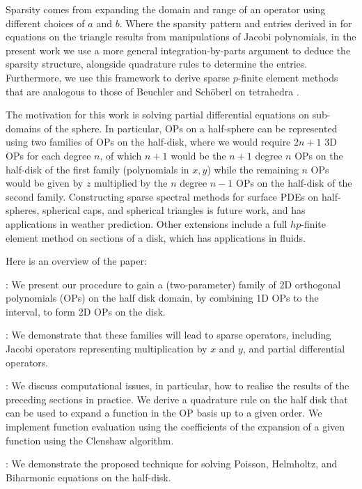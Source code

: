 \documentclass[11pt, oneside]{article}   	%
\begin{document}
 Sparsity comes from expanding the domain and range of an operator  using different choices of $a$ and $b$. Where the sparsity pattern and entries derived in \cite{olver2018recurrence,olver2019triangle} for equations on the triangle  results from manipulations of Jacobi polynomials, in the present work we use a more general integration-by-parts argument to deduce the sparsity structure, alongside quadrature rules to determine the entries.  Furthermore, we use this framework to derive sparse $p$-finite element methods that are analogous to those of Beuchler and Sch\"oberl on tetrahedra \cite{beuchler2006new}. 

The motivation for this work is solving partial differential equations on sub-domains of the sphere. In particular, OPs on a half-sphere can be represented using two families of OPs on the half-disk, where we would require $2n+1$ 3D OPs for each degree $n$, of which $n+1$ would be the $n+1$ degree $n$ OPs on the half-disk of the first family (polynomials in $x,y$) while the remaining $n$ OPs would be given by $z$ multiplied by the $n$ degree $n-1$ OPs on the half-disk of the second family. Constructing sparse spectral methods for surface PDEs on half-spheres, spherical caps, and spherical triangles is future work, and has applications in weather prediction. Other extensions include a full $hp$-finite element method on sections of a disk, which has applications in fluids. 

Here is an overview of the paper:  

\noindent {}: We present our procedure  to gain a (two-parameter) family of 2D orthogonal polynomials (OPs) on the half disk domain, by combining 1D OPs to the interval, to form 2D OPs on the disk. 

\noindent{}: We demonstrate that these families will lead to sparse operators, including Jacobi operators representing multiplication by $x$ and $y$, and partial differential operators.

\noindent{}: We discuss computational issues, in particular, how to realise the results of the preceding sections in practice.  We  derive a quadrature rule on the half disk that can be used to expand a function in the OP basis up to a given order.  We implement function evaluation using the coefficients of the expansion of a given function using the Clenshaw algorithm.

\noindent{}: We demonstrate the proposed technique for solving Poisson, Helmholtz, and Biharmonic equations on the half-disk.  
\end{document}
